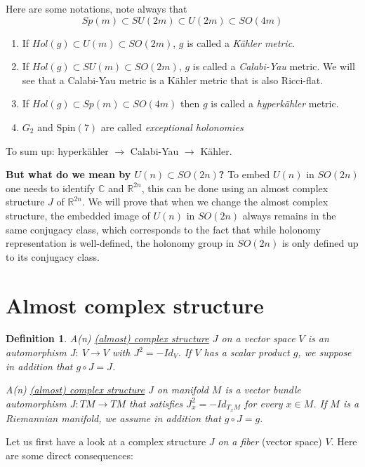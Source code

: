 \documentclass[11pt]{article}
\newtheorem{definition}{Definition}
\begin{document}
Here are some notations, note always that
\[
Sp(m)\subset SU(2m)\subset U(2m)\subset SO(4m)
\]
\begin{enumerate}
\item If \(Hol(g)\subset U(m)\subset SO(2m)\), \(g\) is called a \emph{Kähler metric}.
\item If \(Hol(g)\subset SU(m)\subset SO(2m)\), \(g\) is called a \emph{Calabi-Yau} metric. We will see that a
Calabi-Yau metric is a Kähler metric that is also Ricci-flat.
\item If \(Hol(g)\subset Sp(m)\subset SO(4m)\) then \(g\) is called a \emph{hyperkähler} metric.
\item \(G_2\) and \(\text{Spin}(7)\) are called \emph{exceptional holonomies}
\end{enumerate}

To sum up: hyperkähler \(\longrightarrow\) Calabi-Yau \(\longrightarrow\) Kähler.

\textbf{But what do we mean by \(U(n)\subset SO(2n)\)?} To embed \(U(n)\) in \(SO(2n)\) one needs to identify \(\mathbb{C}\) and \(\mathbb{R}^{2n}\), this can be done using an almost complex structure \(J\) of \(\mathbb{R}^{2n}\). We will prove that when we change the almost complex structure, the embedded image of
\(U(n)\) in \(SO(2n)\) always remains in the same conjugacy class, which corresponds to the
fact that while holonomy representation is well-defined, the holonomy group in \(SO(2n)\) is only
defined up to its conjugacy class.

\section{Almost complex structure}
\label{sec:org96f905f}
\begin{definition}
A(n) \uline{(almost) complex structure} \(J\) on a vector space \(V\) is an automorphism \(J:\ V\longrightarrow V\)
with \(J^2 = -Id_V\). If \(V\) has a scalar product \(g\), we suppose in addition that \(g\circ J = J\).

A(n) \uline{(almost) complex structure} \(J\) on manifold \(M\) is a vector bundle automorphism \(J: TM\longrightarrow
TM\) that satisfies \(J_x^2 = -Id_{T_xM}\) for every \(x\in M\). If \(M\) is a Riemannian manifold, we
assume in addition that \(g\circ J = g\).
\end{definition}

Let us first have a look at a complex structure \(J\) \emph{on a fiber} (vector space) \(V\). Here are some
direct consequences:
\end{document}
